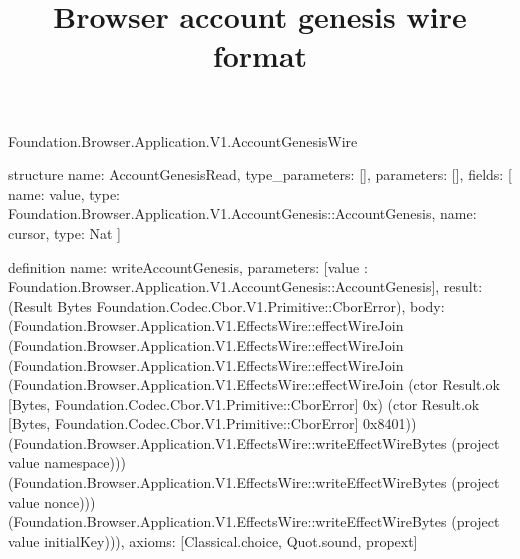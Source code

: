 \begin{lexlean}{Foundation.Browser.Application.V1.AccountGenesisWire}
\title{Browser account genesis wire format}
\begin{semanticmodule}
structure{
  name: AccountGenesisRead,
  type_parameters: [],
  parameters: [],
  fields: [
    {name: value, type: Foundation.Browser.Application.V1.AccountGenesis::AccountGenesis},
    {name: cursor, type: Nat}
  ]
}

definition{
  name: writeAccountGenesis,
  parameters: [value : Foundation.Browser.Application.V1.AccountGenesis::AccountGenesis],
  result: (Result Bytes Foundation.Codec.Cbor.V1.Primitive::CborError),
  body: (Foundation.Browser.Application.V1.EffectsWire::effectWireJoin (Foundation.Browser.Application.V1.EffectsWire::effectWireJoin (Foundation.Browser.Application.V1.EffectsWire::effectWireJoin (Foundation.Browser.Application.V1.EffectsWire::effectWireJoin (ctor Result.ok [Bytes, Foundation.Codec.Cbor.V1.Primitive::CborError] 0x) (ctor Result.ok [Bytes, Foundation.Codec.Cbor.V1.Primitive::CborError] 0x8401)) (Foundation.Browser.Application.V1.EffectsWire::writeEffectWireBytes (project value namespace))) (Foundation.Browser.Application.V1.EffectsWire::writeEffectWireBytes (project value nonce))) (Foundation.Browser.Application.V1.EffectsWire::writeEffectWireBytes (project value initialKey))),
  axioms: [Classical.choice, Quot.sound, propext]
}


\end{semanticmodule}
\end{lexlean}
